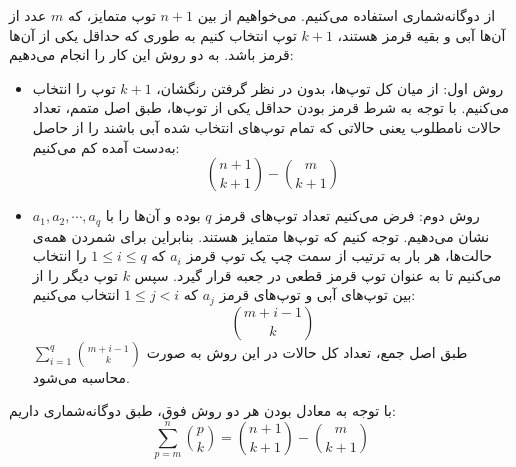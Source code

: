 \p		
از دوگانه‌شماری استفاده می‌کنیم. می‌خواهیم از بین
$n + 1$
توپ متمایز، که 
$m$
عدد از آن‌ها آبی و بقیه قرمز هستند، 
$k + 1$
توپ انتخاب کنیم به طوری که حداقل یکی از آن‌ها قرمز باشد. به دو روش این کار را انجام می‌دهیم:
\begin{itemize}
\item
روش اول: 
از میان کل توپ‌ها، بدون در نظر گرفتن رنگشان،
 $k + 1$
توپ را انتخاب می‌کنیم. با توجه به شرط قرمز بودن حداقل یکی از توپ‌ها، طبق اصل متمم، تعداد حالات نامطلوب یعنی حالاتی که تمام توپ‌های انتخاب شده آبی باشند را از حاصل به‌دست آمده کم می‌کنیم:
$$\binom{n + 1}{k + 1} - \binom{m}{k + 1}$$
\item 
روش دوم:
فرض می‌کنیم تعداد توپ‌های قرمز
$q$
بوده و آن‌ها را با
$a_1, a_2, \cdots, a_q$
نشان می‌دهیم. 
توجه کنیم که توپ‌ها متمایز هستند. بنابراین برای شمردن همه‌ی حالت‌ها، هر بار به ترتیب از سمت چپ یک توپ قرمز 
$a_i$
که
$1\leq i\leq q$
 را انتخاب می‌کنیم تا به عنوان توپ قرمز قطعی در جعبه قرار گیرد.
سپس 
 $k$
 توپ دیگر را از بین توپ‌های آبی و توپ‌های قرمز 
 $a_j$
 که
 $1\leq j<i$
  انتخاب می‌کنیم:
  $$\binom{m+i-1}{k}$$
طبق اصل جمع، تعداد کل حالات در این روش به صورت
 $\sum\limits_{i=1}^{q}\binom{m+i-1}{k}$
محاسبه می‌شود.

\leftline{$\rule{0.4\textwidth}{0.5pt}$}
\leftline{$\rule{0.4\textwidth}{0.5pt}$}
\leftline{$\rule{0.4\textwidth}{0.5pt}$}
\leftline{$\rule{0.4\textwidth}{0.5pt}$}
\leftline{$\rule{0.4\textwidth}{0.5pt}$}

\end{itemize}
با ‌توجه به معادل بودن هر دو روش فوق، طبق دوگانه‌شماری داریم:
$$\sum\limits_{p=m}^{n}\binom{p}{k} = \binom{n + 1}{k + 1} - \binom{m}{k + 1}$$
